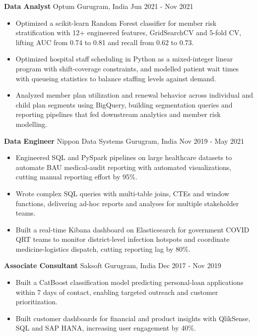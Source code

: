 \documentclass[10pt,a4paper]{article}
\newcommand{\role}[4]{\textbf{#1} \textbar{} #2 \hfill #3 \textbar{} #4\par}
\begin{document}
\vspace{3pt}
\role{Data Analyst}{Optum}{Gurugram, India}{Jun 2021 - Nov 2021}
\begin{itemize}
  \item Optimized a scikit-learn Random Forest classifier for member risk stratification with 12+ engineered features, GridSearchCV and 5-fold CV, lifting AUC from 0.74 to 0.81 and recall from 0.62 to 0.73.
  \item Optimized hospital staff scheduling in Python as a mixed-integer linear program with shift-coverage constraints, and modelled patient wait times with queueing statistics to balance staffing levels against demand.
  \item Analyzed member plan utilization and renewal behavior across individual and child plan segments using BigQuery, building segmentation queries and reporting pipelines that fed downstream analytics and member risk modelling.
\end{itemize}
\vspace{3pt}
\role{Data Engineer}{Nippon Data Systems}{Gurugram, India}{Nov 2019 - May 2021}
\begin{itemize}
  \item Engineered SQL and PySpark pipelines on large healthcare datasets to automate BAU medical-audit reporting with automated visualizations, cutting manual reporting effort by 95\%.
  \item Wrote complex SQL queries with multi-table joins, CTEs and window functions, delivering ad-hoc reports and analyses for multiple stakeholder teams.
  \item Built a real-time Kibana dashboard on Elasticsearch for government COVID QRT teams to monitor district-level infection hotspots and coordinate medicine-logistics dispatch, cutting reporting lag by 80\%.
\end{itemize}
\vspace{3pt}
\role{Associate Consultant}{Saksoft}{Gurugram, India}{Dec 2017 - Nov 2019}
\begin{itemize}
  \item Built a CatBoost classification model predicting personal-loan applications within 7 days of contact, enabling targeted outreach and customer prioritization.
  \item Built customer dashboards for financial and product insights with QlikSense, SQL and SAP HANA, increasing user engagement by 40\%.
\end{itemize}
\end{document}
